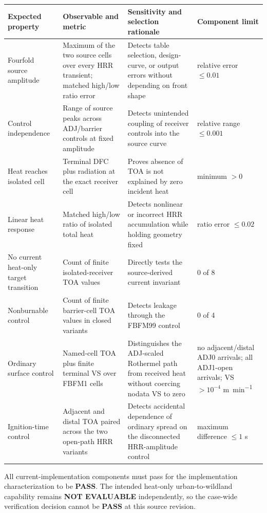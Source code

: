 \begin{center}
\setlength{\tabcolsep}{3pt}
\begin{longtable}{P{0.22\textwidth}P{0.24\textwidth}P{0.25\textwidth}P{0.18\textwidth}}
\toprule
Expected property & Observable and metric & Sensitivity and selection rationale & Component limit \\
\midrule
Fourfold source amplitude & Maximum of the two source cells over every HRR transient; matched high/low ratio error & Detects table selection, design-curve, or output errors without depending on front shape & relative error $\leq0.01$ \\
Control independence & Range of source peaks across ADJ/barrier controls at fixed amplitude & Detects unintended coupling of receiver controls into the source curve & relative range $\leq0.001$ \\
Heat reaches isolated cell & Terminal DFC plus radiation at the exact receiver cell & Proves absence of TOA is not explained by zero incident heat & minimum $>0$ \\
Linear heat response & Matched high/low ratio of isolated total heat & Detects nonlinear or incorrect HRR accumulation while holding geometry fixed & ratio error $\leq0.02$ \\
No current heat-only target transition & Count of finite isolated-receiver TOA values & Directly tests the source-derived current invariant & 0 of 8 \\
Nonburnable control & Count of finite barrier-cell TOA values in closed variants & Detects leakage through the FBFM99 control & 0 of 4 \\
Ordinary surface control & Named-cell TOA plus finite terminal VS over FBFM1 cells & Distinguishes the ADJ-scaled Rothermel path from received heat without coercing nodata VS to zero & no adjacent/distal ADJ0 arrivals; all ADJ1-open arrivals; VS $>10^{-4}$ \si{m.min^{-1}} \\
Ignition-time control & Adjacent and distal TOA paired across the two open-path HRR variants & Detects accidental dependence of ordinary spread on the disconnected HRR-amplitude control & maximum difference $\leq1$ s \\
\bottomrule
\end{longtable}
\end{center}

All current-implementation components must pass for the implementation
characterization to be \textbf{PASS}.  The intended heat-only urban-to-wildland
capability remains \textbf{NOT EVALUABLE} independently, so the case-wide
verification decision cannot be \textbf{PASS} at this source revision.

